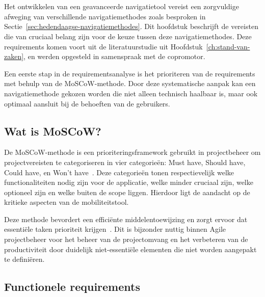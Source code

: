 
\chapter{}%
\label{ch:bepalen-van-de-geschikte-navigatiemethode}


Het ontwikkelen van een geavanceerde navigatietool vereist een zorgvuldige afweging van verschillende navigatiemethodes zoals besproken in Sectie~\ref{sec:hedendaagse-navigatiemethodes}. Dit hoofdstuk beschrijft de vereisten die van cruciaal belang zijn voor de keuze tussen deze navigatiemethodes. Deze requirements komen voort uit de literatuurstudie uit Hoofdstuk~\ref{ch:stand-van-zaken}, en werden opgesteld in samenspraak met de copromotor.

Een eerste stap in de requirementsanalyse is het prioriteren van de requirements met behulp van de MoSCoW-methode. Door deze systematische aanpak kan een navigatiemethode gekozen worden die niet alleen technisch haalbaar is, maar ook optimaal aansluit bij de behoeften van de gebruikers.

\section{Wat is MoSCoW?}

De MoSCoW-methode is een prioriteringsframework gebruikt in projectbeheer om projectvereisten te categoriseren in vier categorieën: Must have, Should have, Could have, en Won't have~\autocite{Brush2023}. Deze categorieën tonen respectievelijk welke functionaliteiten nodig zijn voor de applicatie, welke minder cruciaal zijn, welke optioneel zijn en welke buiten de scope liggen. Hierdoor ligt de aandacht op de kritieke aspecten van de mobiliteitstool.

Deze methode bevordert een efficiënte middelentoewijzing en zorgt ervoor dat essentiële taken prioriteit krijgen~\autocite{Brush2023}. Dit is bijzonder nuttig binnen Agile projectbeheer voor het beheer van de projectomvang en het verbeteren van de productiviteit door duidelijk niet-essentiële elementen die niet worden aangepakt te definiëren.

\section{Functionele requirements}
\label{sec:functionele-requirements}

